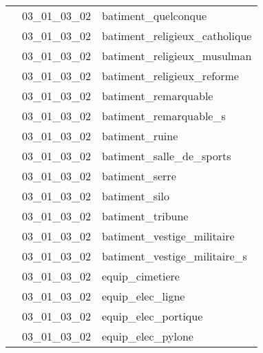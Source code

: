 \documentclass[12pt,titlepage,oneside]{book}
\begin{document}
\begin{supertabular}{|p{10cm}|c|p{15cm}|}
                    & 03\_01\_03\_02 & batiment\_quelconque\\


                    & 03\_01\_03\_02 & batiment\_religieux\_catholique\\


                    & 03\_01\_03\_02 & batiment\_religieux\_musulman\\


                    & 03\_01\_03\_02 & batiment\_religieux\_reforme\\


                    & 03\_01\_03\_02 & batiment\_remarquable\\


                    & 03\_01\_03\_02 & batiment\_remarquable\_s\\


                    & 03\_01\_03\_02 & batiment\_ruine\\


                    & 03\_01\_03\_02 & batiment\_salle\_de\_sports\\


                    & 03\_01\_03\_02 & batiment\_serre\\


                    & 03\_01\_03\_02 & batiment\_silo\\


                    & 03\_01\_03\_02 & batiment\_tribune\\


                    & 03\_01\_03\_02 & batiment\_vestige\_militaire\\


                    & 03\_01\_03\_02 & batiment\_vestige\_militaire\_s\\


                    & 03\_01\_03\_02 & equip\_cimetiere\\


                    & 03\_01\_03\_02 & equip\_elec\_ligne\\


                    & 03\_01\_03\_02 & equip\_elec\_portique\\


                    & 03\_01\_03\_02 & equip\_elec\_pylone\\



\end{supertabular}
\end{document}
